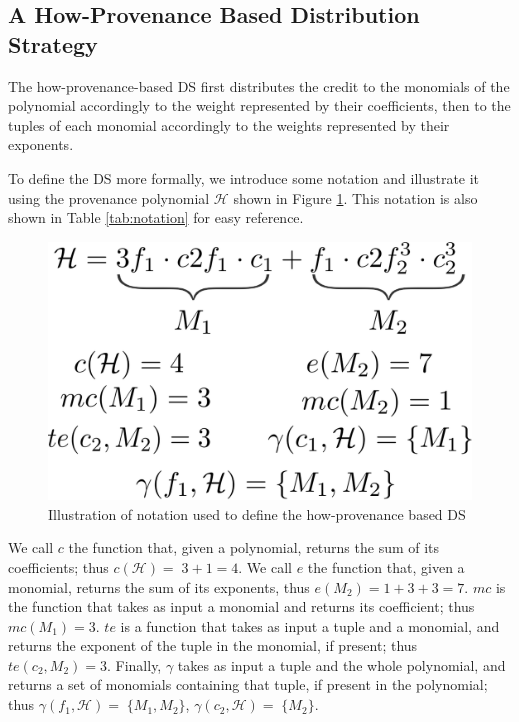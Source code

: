 
\subsection{A How-Provenance Based Distribution Strategy}
\label{section:how_prov_distr_tuples}



The how-provenance-based DS first distributes the credit to the monomials of the polynomial accordingly to the weight represented by their coefficients, then to the tuples of each monomial accordingly to the weights represented by their exponents. 

To define the DS more formally, we introduce some notation and illustrate it using the provenance polynomial $\mathcal{H}$ shown in Figure \ref{figure:how_example}. This notation is also shown  in Table \ref{tab:notation} for easy reference.


\begin{figure}[]
\centering
  \includegraphics[width=.4\textwidth]{figures/how_example}
  \caption{Illustration of notation used to define the how-provenance based DS } %
  \label{figure:how_example}
\end{figure}

We call $c$ the function that, given a polynomial, returns the sum of its coefficients; thus $c(\mathcal{H})=\;3+1=4$. 
We call $e$ the function that, given a monomial, returns the sum of its exponents, thus $e(M_2)=1+3+3=7$.
$mc$ is the function that takes as input a monomial and returns its coefficient; thus $mc(M_1) = 3$. 
$te$ is a function that takes as input a tuple and a monomial, and returns the exponent of the tuple in the monomial, if present; thus $te(c_2, M_2)=3$. 
Finally, $\gamma$ takes as input a tuple and the whole polynomial, and returns a set of monomials containing that tuple, if present in the polynomial; thus $\gamma(f_1, \mathcal{H})=\;\{M_1, M_2\}$, $\gamma(c_2, \mathcal{H})=\;\{M_2\}$. 

